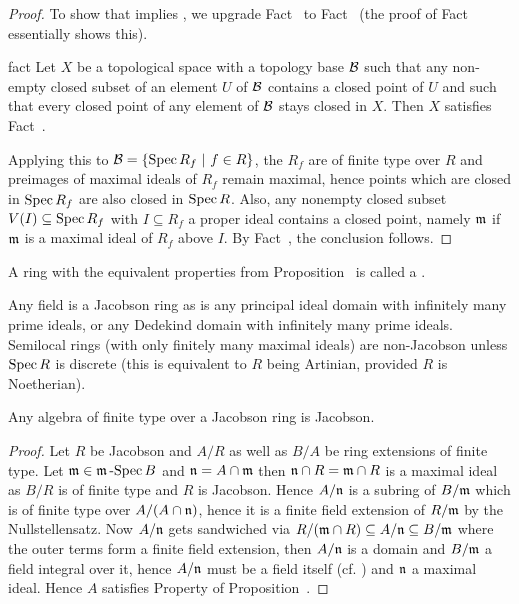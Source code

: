 \documentclass[a4paper,parskip=half,numbers=enddot, DIV=12]{scrreprt}
\begin{document}
\begin{proof}
    To show that  implies , we upgrade Fact~ to Fact~ (the proof of Fact~ essentially shows this).
    
    \begin{varthm}[++]{fact}
        Let $X$ be a topological space with a topology base $\mathcal{B}$ such that any non-empty closed subset of an element $U$ of $\mathcal{B}$ contains a closed point of $U$ and such that every closed point of any  element of $\mathcal{B}$ stays closed in $X$. Then $X$ satisfies Fact~.
    \end{varthm}
    
    Applying this to $\mathcal{B} = \left\{\operatorname{Spec} R_f \ \middle|\  f\in R\right\}$, the $R_f$ are of finite type over $R$ and preimages of maximal ideals of $R_f$ remain maximal, hence points which are closed in $\operatorname{Spec} R_f$ are also closed in $\operatorname{Spec} R$. Also, any nonempty closed subset $V(I)\subseteq \operatorname{Spec} R_f$ with $I\subseteq R_f$ a proper ideal contains a closed point, namely $\mathfrak{m}$ if $\mathfrak{m}$ is a maximal ideal of $R_f$ above $I$. By Fact~, the conclusion follows. 
\end{proof}
\begin{defi}
    A ring with the equivalent properties from Proposition~ is called a .
\end{defi}
\begin{example}
    Any field is a Jacobson ring as is any principal ideal domain with infinitely many prime ideals, or any Dedekind domain with infinitely many prime ideals. Semilocal rings (with only finitely many maximal ideals) are non-Jacobson unless $\operatorname{Spec} R$ is discrete (this is equivalent to $R$ being Artinian, provided $R$ is Noetherian).
\end{example}
\begin{cor}
    Any algebra of finite type over a Jacobson ring is Jacobson.
\end{cor}
\begin{proof}
    Let $R$ be Jacobson and $A/R$ as well as $B/A$ be ring extensions of finite type. Let $\mathfrak{m}\in \mathfrak{m}\operatorname{-Spec} B$ and $\mathfrak{n} = A\cap \mathfrak{m}$ then $\mathfrak{n}\cap R = \mathfrak{m}\cap R$ is a maximal ideal as $B/R$ is of finite type and $R$ is Jacobson. Hence $A/\mathfrak{n}$ is a subring of $B/\mathfrak{m}$ which is of finite type over $A/(A\cap\mathfrak{n})$, hence it is a finite field extension of $R/\mathfrak{m}$ by the Nullstellensatz. Now $A/\mathfrak{n}$ gets sandwiched via $R/(\mathfrak{m}\cap R) \subseteq A/\mathfrak{n} \subseteq B/\mathfrak{m}$ where the outer terms form a finite field extension, then $A/\mathfrak{n}$ is a domain and $B/\mathfrak{m}$ a field integral over it, hence $A/\mathfrak{n}$ must be a field itself (cf. \cite[Proposition~1.5.1]{alg1}) and $\mathfrak{n}$ a maximal ideal. Hence $A$ satisfies Property  of Proposition~.
\end{proof}
\end{document}
